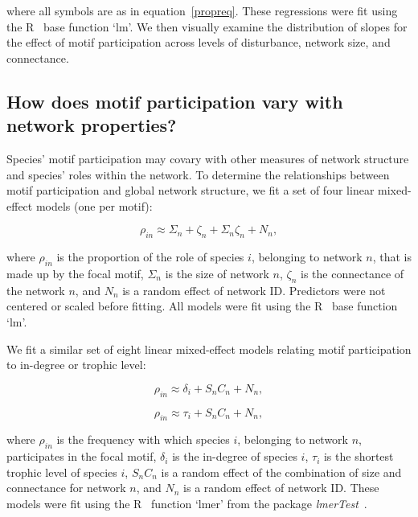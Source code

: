\documentclass[12pt]{article}
\begin{document}
\begin{spacing}{2.0}
        \noindent where all symbols are as in equation~\ref{propreq}.
        These regressions were fit using the R~\citep{R} base function `lm'.
        We then visually examine the distribution of slopes for the effect of motif participation across levels of disturbance, network size, and connectance. 


    \subsection{How does motif participation vary with network properties?}

        Species' motif participation may covary with other measures of network structure and species' roles within the network.
        To determine the relationships between motif participation and global network structure, we fit a set of four linear mixed-effect models (one per motif):

        \begin{equation}
            \rho_{in} \approx \Sigma_{n} + \zeta_{n} + \Sigma_{n}\zeta_{n} + N_n ,
            \label{partic_SC}
        \end{equation}
        
        \noindent where $\rho_{in}$ is the proportion of the role of species $i$, belonging to network $n$, that is made up by the focal motif,
        $\Sigma_{n}$ is the size of network $n$, $\zeta_{n}$ is the connectance of the network $n$, and $N_n$ is a random effect of network ID.
        Predictors were not centered or scaled before fitting.
        All models were fit using the R~\citep{R} base function `lm'.

       
        We fit a similar set of eight linear mixed-effect models relating motif participation to in-degree or trophic level:
        
        \begin{equation}
            \rho_{in} \approx \delta_{i} + S_{n}C_{n} + N_n,
            \label{partic_deg}
        \end{equation}

        \begin{equation}
            \rho_{in} \approx \tau_{i} + S_{n}C_{n} + N_n,
            \label{partic_deg}
        \end{equation}
        
        \noindent where $\rho_{in}$ is the frequency with which species $i$, belonging to network $n$, participates in the focal motif, $\delta_{i}$ is the in-degree of species $i$, $\tau_{i}$ is the shortest trophic level of species $i$, $S_{n}C_{n}$ is a random effect of the combination of size and connectance for network $n$, and $N_n$ is a random effect of network ID.
        These models were fit using the R~\citep{R} function `lmer' from the package \emph{lmerTest}~\citep{lmerTest}.


\end{spacing}
\end{document}
